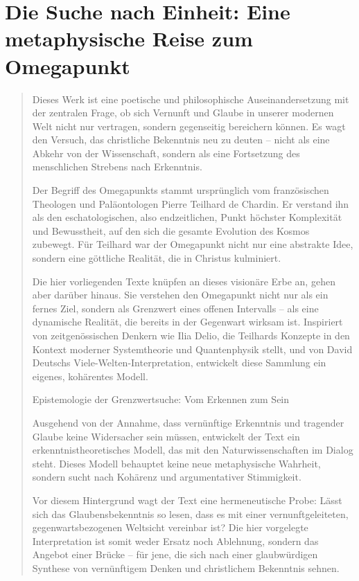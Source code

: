 \documentclass[
  ngerman,
]{article}
\begin{document}
\section{\texorpdfstring{\textbf{Die Suche nach Einheit: Eine
metaphysische Reise zum
Omegapunkt}}{Die Suche nach Einheit: Eine metaphysische Reise zum Omegapunkt}}\label{die-suche-nach-einheit-eine-metaphysische-reise-zum-omegapunkt}

\begin{quote}
Dieses Werk ist eine poetische und philosophische Auseinandersetzung mit
der zentralen Frage, ob sich Vernunft und Glaube in unserer modernen
Welt nicht nur vertragen, sondern gegenseitig bereichern können. Es wagt
den Versuch, das christliche Bekenntnis neu zu deuten -- nicht als eine
Abkehr von der Wissenschaft, sondern als eine Fortsetzung des
menschlichen Strebens nach Erkenntnis.

Der Begriff des Omegapunkts stammt ursprünglich vom französischen
Theologen und Paläontologen Pierre Teilhard de Chardin. Er verstand ihn
als den eschatologischen, also endzeitlichen, Punkt höchster Komplexität
und Bewusstheit, auf den sich die gesamte Evolution des Kosmos zubewegt.
Für Teilhard war der Omegapunkt nicht nur eine abstrakte Idee, sondern
eine göttliche Realität, die in Christus kulminiert.

Die hier vorliegenden Texte knüpfen an dieses visionäre Erbe an, gehen
aber darüber hinaus. Sie verstehen den Omegapunkt nicht nur als ein
fernes Ziel, sondern als Grenzwert eines offenen Intervalls -- als eine
dynamische Realität, die bereits in der Gegenwart wirksam ist.
Inspiriert von zeitgenössischen Denkern wie Ilia Delio, die Teilhards
Konzepte in den Kontext moderner Systemtheorie und Quantenphysik stellt,
und von David Deutschs Viele-Welten-Interpretation, entwickelt diese
Sammlung ein eigenes, kohärentes Modell.

Epistemologie der Grenzwertsuche: Vom Erkennen zum Sein

Ausgehend von der Annahme, dass vernünftige Erkenntnis und tragender
Glaube keine Widersacher sein müssen, entwickelt der Text ein
erkenntnistheoretisches Modell, das mit den Naturwissenschaften im
Dialog steht. Dieses Modell behauptet keine neue metaphysische Wahrheit,
sondern sucht nach Kohärenz und argumentativer Stimmigkeit.

Vor diesem Hintergrund wagt der Text eine hermeneutische Probe: Lässt
sich das Glaubensbekenntnis so lesen, dass es mit einer
vernunftgeleiteten, gegenwartsbezogenen Weltsicht vereinbar ist? Die
hier vorgelegte Interpretation ist somit weder Ersatz noch Ablehnung,
sondern das Angebot einer Brücke -- für jene, die sich nach einer
glaubwürdigen Synthese von vernünftigem Denken und christlichem
Bekenntnis sehnen.


\end{quote}
\end{document}
